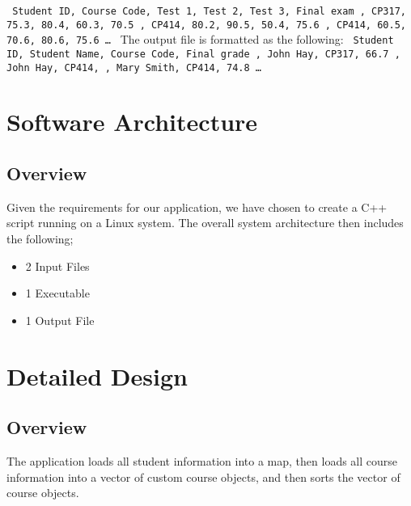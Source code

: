 \documentclass{article}
\begin{document}
\texttt{  \newline
  Student ID, Course Code, Test 1, Test 2, Test 3, Final exam , CP317, 75.3, 80.4, 60.3, 70.5 , CP414, 80.2, 90.5, 50.4, 75.6 , CP414, 60.5, 70.6, 80.6, 75.6 \newline
  \ldots
}
\newline \newline
The output file is formatted as the following:
\texttt{  \newline
  Student ID, Student Name, Course Code, Final grade , John Hay, CP317, 66.7 , John Hay, CP414, , Mary Smith, CP414, 74.8 \newline
  \ldots
}

\section{Software Architecture}
\subsection{Overview}
Given the requirements for our application, we have chosen to create a C++ script running on a Linux system.
The overall system architecture then includes the following; 
\begin{itemize}
\item 2 Input Files
\item 1 Executable
\item 1 Output File
\end{itemize}

\section{Detailed Design}
\subsection{Overview}
The application loads all student information into a map, then loads all course information into a vector of custom course objects, and then sorts the vector of course objects.
\end{document}
